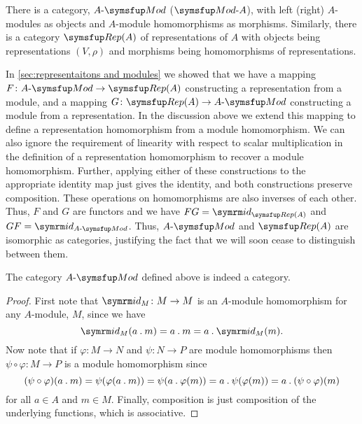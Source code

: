 \begin{remark}{}{}
    There is a category, \(\AMod\) (\(\ModA\)), with left (right) \(A\)-modules as objects and \(A\)-module homomorphisms as morphisms.
    Similarly, there is a category \(\Rep(A)\) of representations of \(A\) with objects being representations \((V, \rho)\) and morphisms being homomorphisms of representations.
    
    In \cref{sec:representaitons and modules} we showed that we have a mapping \(F \colon \AMod \to \Rep(A)\) constructing a representation from a module, and a mapping \(G \colon \Rep(A) \to \AMod\) constructing a module from a representation.
    In the discussion above we extend this mapping to define a representation homomorphism from a module homomorphism.
    We can also ignore the requirement of linearity with respect to scalar multiplication in the definition of a representation homomorphism to recover a module homomorphism.
    Further, applying either of these constructions to the appropriate identity map just gives the identity, and both constructions preserve composition.
    These operations on homomorphisms are also inverses of each other.
    Thus, \(F\) and \(G\) are functors and we have \(FG = \id_{\Rep(A)}\) and \(GF = \id_{\AMod}\).
    Thus, \(\AMod\) and \(\Rep(A)\) are isomorphic as categories, justifying the fact that we will soon cease to distinguish between them.
\end{remark}

\begin{lma}{}{}
    The category \(\AMod\) defined above is indeed a category.
    \begin{proof}
        First note that \(\id_M \colon M \to M\) is an \(A\)-module homomorphism for any \(A\)-module, \(M\), since we have
        \begin{equation}
            \id_M(a \action m) = a \action m = a \action \id_M(m).
        \end{equation}
        Now note that if \(\varphi \colon M \to N\) and \(\psi \colon N \to P\) are module homomorphisms then \(\psi \circ \varphi \colon M \to P\) is a module homomorphism since
        \begin{equation*}
            (\psi \circ \varphi)(a \mathbin{.} m) = \psi(\varphi(a \mathbin{.} m)) = \psi(a \mathbin{.} \varphi(m)) = a \mathbin{.} \psi(\varphi(m)) = a \mathbin{.} (\psi \circ \varphi)(m)
        \end{equation*}
        for all \(a \in A\) and \(m \in M\).
        Finally, composition is just composition of the underlying functions, which is associative.
    \end{proof}
\end{lma}

